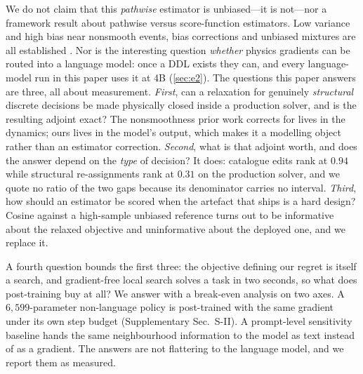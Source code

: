 \documentclass[journal]{IEEEtran}
\newcommand{\ddl}{DDL}
\begin{document}
We do not claim that this \emph{pathwise} estimator is unbiased---it is not---nor
a framework result about pathwise versus score-function estimators.  Low
variance and high bias near nonsmooth events, bias corrections and unbiased
mixtures are all established
\cite{suh2022diffsim,onoda2026ddcg,scheffler2026cfobg,hpo2026}.  Nor is the
interesting question \emph{whether} physics gradients can be routed into a
language model: once a \ddl{} exists they can, and every language-model run in this paper uses
it at 4B (\cref{sec:e2}).  The questions this paper answers are three, all about measurement.  \emph{First}, can a relaxation for genuinely
\emph{structural} discrete decisions be made physically closed inside a
production solver, and is the resulting adjoint exact?  The nonsmoothness prior
work corrects for lives in the dynamics; ours lives in the model's output, which
makes it a modelling object rather than an estimator correction.
\emph{Second}, what is that adjoint worth, and does the answer depend on the
\emph{type} of decision?  It does: catalogue edits rank at $0.94$ while
structural re-assignments rank at $0.31$ on the production solver, and we quote
no ratio of the two gaps because its denominator carries no interval.
\emph{Third}, how should an estimator be scored when the artefact that ships is
a hard design?  Cosine against a high-sample unbiased reference turns out to be
informative about the relaxed objective and uninformative about the deployed
one, and we replace it.

A fourth question bounds the first three: the objective defining our regret is
itself a search, and gradient-free local search solves a task in two seconds, so
what does post-training buy at all?  We answer with a break-even analysis on two axes.  A $6{,}599$-parameter
non-language policy is post-trained with the same gradient under its own step
budget (Supplementary Sec.~S-II). A prompt-level sensitivity baseline hands
the same neighbourhood information to the model as text instead of as a gradient.  The
answers are not flattering to the language model, and we report them as
measured.
\end{document}
